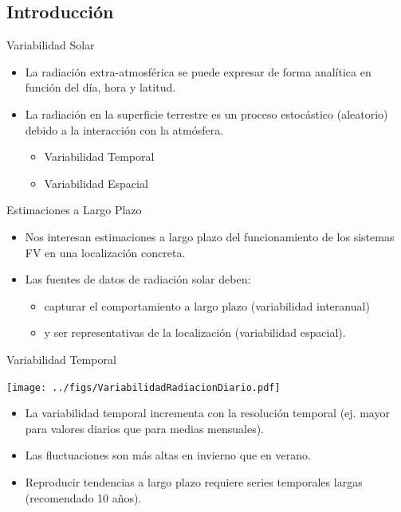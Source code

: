 \documentclass[xcolor={usenames,svgnames,dvipsnames}]{beamer}
\begin{document}
\subsection{Introducción}
\label{sec:org63463a5}
\begin{frame}[label={sec:org6f76a51}]{Variabilidad Solar}
\begin{itemize}
\item La \alert{radiación extra-atmosférica} se puede expresar de forma \alert{analítica} en función del día, hora y latitud.
\item La \alert{radiación en la superficie terrestre} es un \alert{proceso estocástico} (aleatorio) debido a la interacción con la atmósfera.
\begin{itemize}
\item Variabilidad Temporal
\item Variabilidad Espacial
\end{itemize}
\end{itemize}
\end{frame}
\begin{frame}[label={sec:orgb375745}]{Estimaciones a Largo Plazo}
\begin{itemize}
\item Nos interesan \alert{estimaciones a largo plazo} del funcionamiento de los sistemas FV en una localización concreta.
\item Las fuentes de datos de radiación solar deben:
\begin{itemize}
\item \alert{capturar el comportamiento a largo plazo} (variabilidad interanual)
\item y ser \alert{representativas de la localización} (variabilidad espacial).
\end{itemize}
\end{itemize}
\end{frame}

\begin{frame}[label={sec:orgc81a2cc}]{Variabilidad Temporal}
\begin{center}
\texttt{[image: ../figs/VariabilidadRadiacionDiario.pdf]}
\end{center}

\begin{itemize}
\item La variabilidad temporal \alert{incrementa con la resolución temporal} (ej. mayor para valores diarios que para medias mensuales).
\item Las fluctuaciones son \alert{más altas en invierno que en verano}.
\item Reproducir \alert{tendencias a largo plazo} requiere \alert{series temporales largas} (recomendado 10 años).
\end{itemize}
\end{frame}
\end{document}
